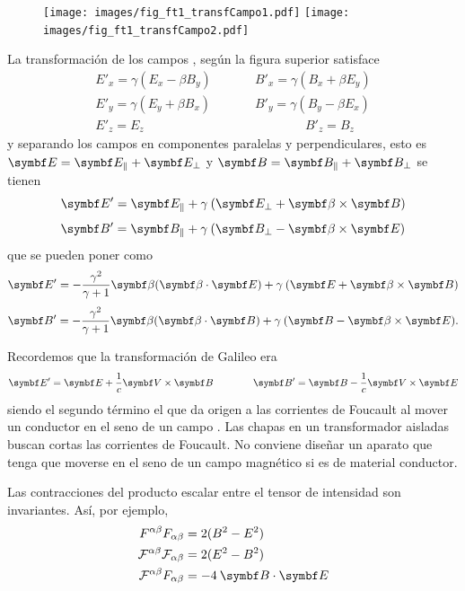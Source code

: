 \documentclass[10pt,oneside]{CBFT_book}
\begin{document}
\begin{figure}[htb]
	\begin{center}
	\texttt{[image: images/fig\_ft1\_transfCampo1.pdf]}
	\texttt{[image: images/fig\_ft1\_transfCampo2.pdf]} 
	\end{center}
	\caption{}
\end{figure} 

La transformación de los campos ,  según la figura superior satisface 
\begin{align*}
	&E'_x = \gamma ( E_x - \beta B_y ) &\qquad B'_x = \gamma ( B_x + \beta E_y ) \\
	&E'_y = \gamma ( E_y + \beta B_x ) &\qquad B'_y = \gamma ( B_y - \beta E_x ) \\
	&E'_z = E_z \qquad \qquad \qquad & \qquad \qquad \qquad B'_z = B_z &  
\end{align*}
y separando los campos en componentes paralelas y perpendiculares, esto es
$\vb{E} = \vb{E}_\parallel + \vb{E}_\perp $ y $\vb{B} = \vb{B}_\parallel + \vb{B}_\perp $
se tienen
\[
	\vb{E}' = \vb{E}_\parallel + \gamma \: ( \vb{E}_\perp  + \pv{\beta}{B} )
\]
\[
	\vb{B}' = \vb{B}_\parallel + \gamma \: ( \vb{B}_\perp  - \pv{\beta}{E} )
\]
que se pueden poner como 
\[
	\vb{E}' = - \frac{ \gamma^2 }{ \gamma + 1 }\vb{\beta} (\pe{\beta}{E}) +
		\gamma \: ( \vb{E}  + \pv{\beta}{B} )
\]
\[
	\vb{B}' = - \frac{ \gamma^2 }{ \gamma + 1 }\vb{\beta} (\pe{\beta}{B}) + 
		\gamma \: ( \vb{B}  - \pv{\beta}{E} ).
\]

Recordemos que la transformación de Galileo era
\[
	\vb{E}' = \vb{E} + \frac{1}{c} \pv{V}{B} \qquad \qquad 
	\vb{B}' = \vb{B} - \frac{1}{c} \pv{V}{E}
\]
siendo el segundo término el que da origen a las corrientes de Foucault al mover 
un conductor en el seno de un campo .
Las chapas en un transformador aisladas buscan cortas las corrientes de Foucault.
No conviene diseñar un aparato que tenga que moverse en el seno de un campo
magnético si es de material conductor.


Las contracciones del producto escalar entre el tensor de intensidad son invariantes.
Así, por ejemplo,
\begin{align*}
	F^{\alpha\beta}F_{\alpha\beta} &= 2( B^2 - E^2 ) \\
	\mathcal{F}^{\alpha\beta}\mathcal{F}_{\alpha\beta} &= 2( E^2 - B^2 ) \\
	\mathcal{F}^{\alpha\beta}F_{\alpha\beta} &= -4 \: \pe{B}{E}
\end{align*}
\end{document}
